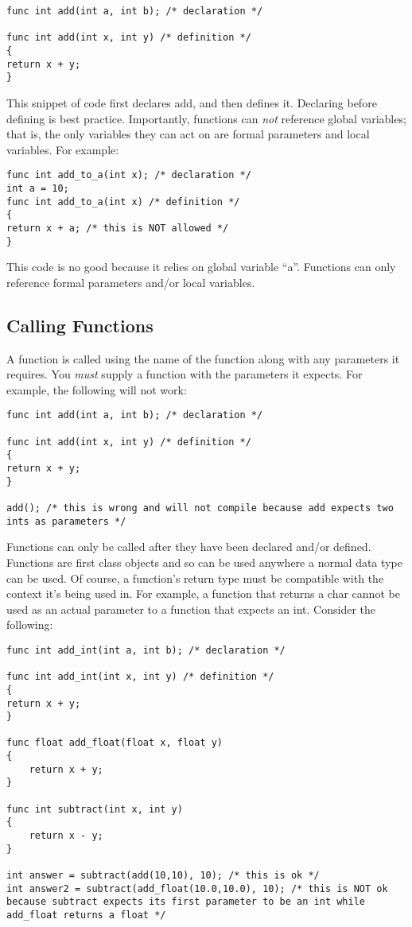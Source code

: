 \documentclass{article}
\begin{document}
\begin{lstlisting}
func int add(int a, int b); /* declaration */

func int add(int x, int y) /* definition */
{
return x + y;
}
\end{lstlisting}

This snippet of code first declares add, and then defines it. Declaring before defining is best practice. Importantly, functions can \emph{not} reference global variables; that is, the only variables they can act on are formal parameters and local variables. For example:

\begin{lstlisting}
func int add_to_a(int x); /* declaration */
int a = 10;
func int add_to_a(int x) /* definition */
{
return x + a; /* this is NOT allowed */
}
\end{lstlisting}

This code is no good because it relies on global variable ``a''. Functions can only reference formal parameters and/or local variables.

\subsection{Calling Functions}

A function is called using the name of the function along with any parameters it requires. You \emph{must} supply a function with the parameters it expects. For example, the following will not work:

\begin{lstlisting}
func int add(int a, int b); /* declaration */

func int add(int x, int y) /* definition */
{
return x + y;
}

add(); /* this is wrong and will not compile because add expects two ints as parameters */

\end{lstlisting}

Functions can only be called after they have been declared and/or defined. Functions are first class objects and so can be used anywhere a normal data type can be used. Of course, a function's return type must be compatible with the context it's being used in. For example, a function that returns a char cannot be used as an actual parameter to a function that expects an int.  Consider the following:

\begin{lstlisting}
func int add_int(int a, int b); /* declaration */

func int add_int(int x, int y) /* definition */
{
return x + y;
}

func float add_float(float x, float y)
{
	return x + y;
}

func int subtract(int x, int y)
{
	return x - y;
}

int answer = subtract(add(10,10), 10); /* this is ok */
int answer2 = subtract(add_float(10.0,10.0), 10); /* this is NOT ok because subtract expects its first parameter to be an int while add_float returns a float */

\end{lstlisting}
\end{document}
